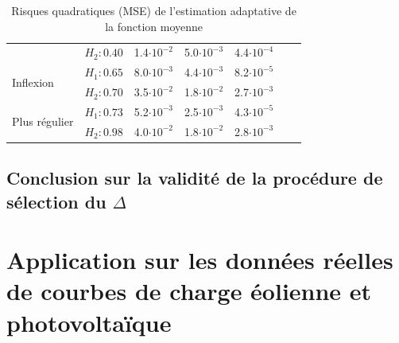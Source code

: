 \begin{table}[H]
\begin{tabularx}{\linewidth}{|X|X|X|X|X|X|X|}
		\\
		                                     & $H_2 : 0.40$ & 1.4$\cdot 10^{-2}$                                & 5.0$\cdot 10^{-3}$                                          & 4.4$\cdot 10^{-4}$                                 &                           &
		\\
		\cmidrule{1-5}
		\multirow{2}{\hsize}{Inflexion}      & $H_1 : 0.65$ & 8.0$\cdot 10^{-3}$                                & 4.4$\cdot 10^{-3}$                                          & 8.2$\cdot 10^{-5}$                                 &                           &
		\\
		                                     & $H_2 : 0.70$ & 3.5$\cdot 10^{-2}$                                & 1.8$\cdot 10^{-2}$                                          & 2.7$\cdot 10^{-3}$                                 &                           &
		\\
		\cmidrule{1-5}
		\multirow{2}{\hsize}{Plus régulier}  & $H_1 : 0.73$ & 5.2$\cdot 10^{-3}$                                & 2.5$\cdot 10^{-3}$                                          & 4.3$\cdot 10^{-5}$                                 &                           &
		\\
		                                     & $H_2 : 0.98$ & 4.0$\cdot 10^{-2}$                                & 1.8$\cdot 10^{-2}$                                          & 2.8$\cdot 10^{-3}$                                 &                           &
		\\
		\bottomrule
	\end{tabularx}
	\caption{Risques quadratiques (MSE) de l'estimation adaptative de la fonction moyenne}
\end{table}

\subsection{Conclusion sur la validité de la procédure de sélection du $\Delta$}


\section{
  Application sur les données réelles de courbes de charge éolienne et photovoltaïque
 }

